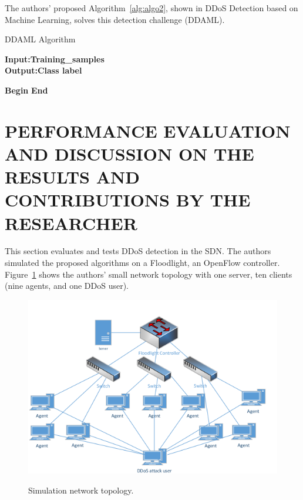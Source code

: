 \documentclass[12pt]{report}
\begin{document}
The authors’ proposed Algorithm~\ref{alg:algo2}, shown in DDoS Detection  based on Machine Learning, solves this detection challenge (DDAML).

\begin{center}
\begin{minipage}{0.5\textwidth}
  \begin{algorithm}[H]
\caption{DDAML Algorithm}
\label{alg:algo2}
\hspace{\algorithmicindent} \textbf{Input:}\textbf{Training\_samples}\\
\hspace*{\algorithmicindent} \textbf{Output:}\textbf{Class label}
\begin{algorithmic}[1]
    \State \textbf{Begin}
    \Else
    \State {}
    \EndIf
    \EndIf
    \State \textbf{End}
\end{algorithmic}
\end{algorithm}  
\end{minipage}
\end{center}

\section{PERFORMANCE EVALUATION AND DISCUSSION ON THE RESULTS AND CONTRIBUTIONS BY THE RESEARCHER}
This section evaluates and tests DDoS detection in the SDN.  The authors simulated the proposed algorithms on a Floodlight, an OpenFlow controller. Figure~\ref{fig:topo} shows the authors' small network topology with one server, ten clients (nine agents, and one DDoS user). \\

\begin{figure}[H]
    \centering
    \includegraphics[scale=0.4]{fig20.png}\\
    \caption{Simulation network topology.}
    \label{fig:topo}
\end{figure}
\end{document}
